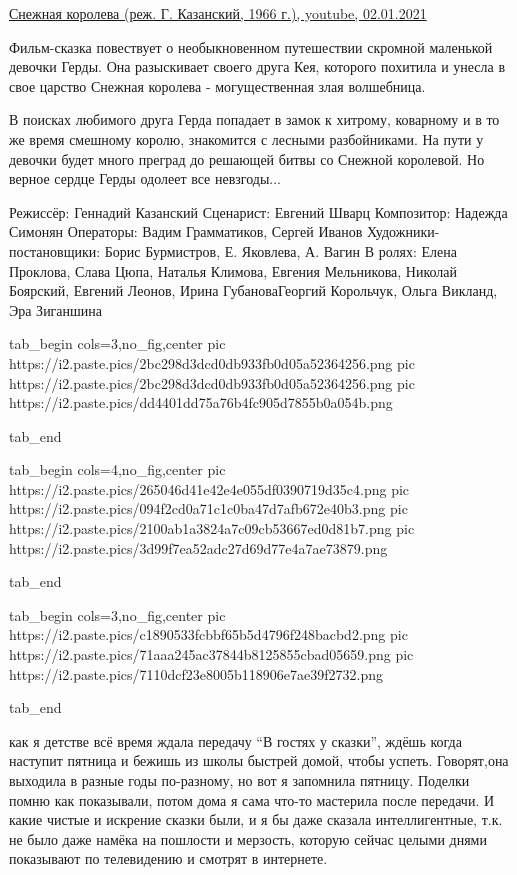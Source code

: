 \begin{itemize}
\href{https://youtu.be/_XiBoSZwKUw}{%
Снежная королева (реж. Г. Казанский, 1966 г.), youtube, 02.01.2021%
}


Фильм-сказка повествует о необыкновенном путешествии скромной маленькой девочки
Герды. Она разыскивает своего друга Кея, которого похитила и унесла в свое
царство Снежная королева - могущественная злая волшебница.

В поисках любимого друга Герда попадает в замок к хитрому, коварному и в то же
время смешному королю, знакомится с лесными разбойниками. На пути у девочки
будет много преград до решающей битвы со Снежной королевой. Но верное сердце
Герды одолеет все невзгоды...

\obeycr
Режиссёр: Геннадий Казанский
Сценарист: Евгений Шварц
Композитор: Надежда Симонян
Операторы: Вадим Грамматиков, Сергей Иванов
Художники-постановщики: Борис Бурмистров, Е. Яковлева, А. Вагин 
В ролях: Елена Проклова, Слава Цюпа, Наталья Климова, Евгения Мельникова, Николай Боярский, Евгений Леонов, Ирина ГубановаГеоргий Корольчук, Ольга Викланд, Эра Зиганшина
\restorecr

\ifcmt
  tab_begin cols=3,no_fig,center
		pic https://i2.paste.pics/2bc298d3dcd0db933fb0d05a52364256.png
		pic https://i2.paste.pics/2bc298d3dcd0db933fb0d05a52364256.png
		pic https://i2.paste.pics/dd4401dd75a76b4fc905d7855b0a054b.png

  tab_end

  tab_begin cols=4,no_fig,center
		pic https://i2.paste.pics/265046d41e42e4e055df0390719d35c4.png
		pic https://i2.paste.pics/094f2cd0a71c1c0ba47d7afb672e40b3.png
		pic https://i2.paste.pics/2100ab1a3824a7c09cb53667ed0d81b7.png
		pic https://i2.paste.pics/3d99f7ea52adc27d69d77e4a7ae73879.png

  tab_end

  tab_begin cols=3,no_fig,center
		pic https://i2.paste.pics/c1890533fcbbf65b5d4796f248bacbd2.png
		pic https://i2.paste.pics/71aaa245ac37844b8125855cbad05659.png
		pic https://i2.paste.pics/7110dcf23e8005b118906e7ae39f2732.png

  tab_end
\fi


\begin{multicols}{2}

как я детстве всё время ждала передачу \enquote{В гостях у сказки}, ждёшь когда
наступит пятница и бежишь из школы быстрей домой, чтобы успеть. Говорят,она
выходила в разные годы по-разному, но вот я запомнила пятницу. Поделки помню
как показывали, потом дома я сама что-то мастерила после передачи. И какие
чистые и искрение сказки были, и я бы даже сказала интеллигентные, т.к. не было
даже намёка на пошлости и мерзость, которую сейчас целыми днями показывают по
телевидению и смотрят в интернете.


\end{multicols}
\end{itemize}
